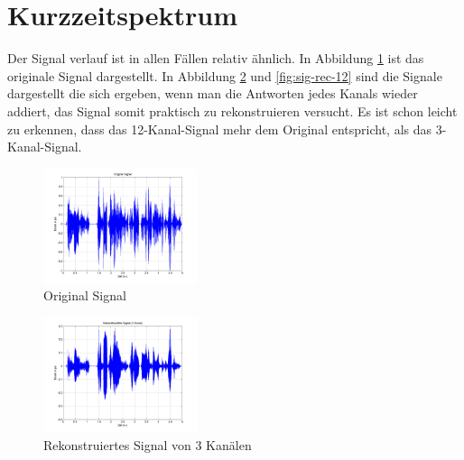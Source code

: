 \documentclass[conference]{IEEEtran}
\begin{document}
\section{Kurzzeitspektrum}
\begin{compactenum}[a)]
\item Der Signal verlauf ist in allen Fällen relativ ähnlich. In Abbildung \ref{fig:sig-orig} ist das originale Signal dargestellt. In Abbildung \ref{fig:sig-rec-3} und \ref{fig:sig-rec-12} sind die Signale dargestellt die sich ergeben, wenn man die Antworten jedes Kanals wieder addiert, das Signal somit praktisch zu rekonstruieren versucht. Es ist schon leicht zu erkennen, dass das 12-Kanal-Signal mehr dem Original entspricht, als das 3-Kanal-Signal. 
\begin{figure}[h!]
	\vspace{-5pt}
	\centering
	\includegraphics[width=0.4\textwidth]{img/sig_orig.png}
	\vspace{-10pt}
	\caption{Original Signal}
	\vspace{-10pt}
	\label{fig:sig-orig}
\end{figure}

\begin{figure}[h!]
	\vspace{-5pt}
	\centering
	\includegraphics[width=0.4\textwidth]{img/sig_rec_3.png}
	\vspace{-10pt}
	\caption{Rekonstruiertes Signal von 3 Kanälen}
	\vspace{-10pt}
	\label{fig:sig-rec-3}
\end{figure}


\end{compactenum}
\end{document}
